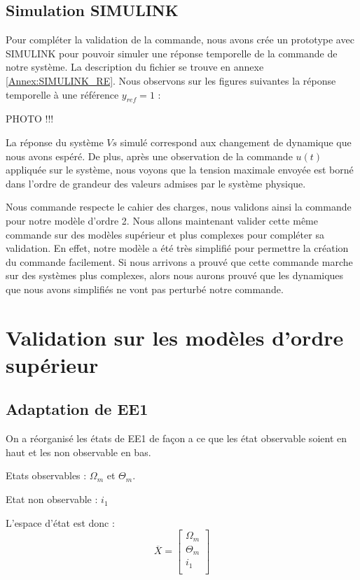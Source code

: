 \subsection{Simulation SIMULINK}
Pour compléter la validation de la commande, nous avons crée un prototype avec SIMULINK pour pouvoir simuler une réponse temporelle de la commande de notre système. La description du fichier se trouve en annexe \ref{Annex:SIMULINK_RE}. Nous observons sur les figures suivantes la réponse temporelle à une référence $y_{ref} = 1$ : 

PHOTO !!!

La réponse du système $Vs$ simulé correspond aux changement de dynamique que nous avons espéré. De plus, après une observation de la commande $u(t)$ appliquée sur le système, nous voyons que la tension maximale envoyée est borné dans l'ordre de grandeur des valeurs admises par le système physique. 

Nous commande respecte le cahier des charges, nous validons ainsi la commande pour notre modèle d'ordre 2. Nous allons maintenant valider cette même commande sur des modèles supérieur et plus complexes pour compléter sa validation. En effet, notre modèle a été très simplifié pour permettre la création du commande facilement. Si nous arrivons a prouvé que cette commande marche sur des systèmes plus complexes, alors nous aurons prouvé que les dynamiques que nous avons simplifiés ne vont pas perturbé notre commande.

\section{Validation sur les modèles d'ordre supérieur}
\subsection{Adaptation de EE1}
On a réorganisé les états de EE1 de façon a ce que les état observable soient en haut et les non observable en bas.

\noindent\textbullet\hspace{2mm} Etats observables : $\Omega_m$ et $ \Theta_m$.

\noindent\textbullet\hspace{2mm} Etat non observable : $i_1$

\noindent\textbullet\hspace{2mm} L'espace d'état est donc : 
\begin{equation}
\overline{X} = \begin{bmatrix}
\Omega_m\\
\Theta_m\\
i_1\\
\end{bmatrix}
\end{equation}


